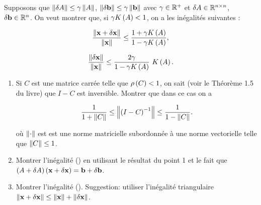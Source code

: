 Supposons que $\left\lVert\delta A\right\rVert \leq \gamma \left\lVert A\right\rVert$, $\left\lVert\delta \mathbf{b}\right\rVert \leq \gamma \left\lVert\mathbf{b}\right\rVert$ avec $\gamma \in \mathbb{R}^{+}$ et $\delta A \in \mathbb{R}^{n \times n}$, $\delta \mathbf{b} \in \mathbb{R}^{n}$.
On veut montrer que, si $\gamma K \left(A\right) < 1$, on a les inégalités suivantes :

\begin{equation}
\label{eq:xPlusDelta}
  \dfrac{\left\lVert\mathbf{x} + \delta \mathbf{x}\right\rVert}{\left\lVert\mathbf{x}\right\rVert}
  \leq \dfrac{1 + \gamma K \left(A\right)}{1 - \gamma K \left(A\right)},
\end{equation}

\begin{equation}
\label{eq:xDelta}
  \dfrac{\left\lVert\delta \mathbf{x}\right\rVert}{\left\lVert\mathbf{x}\right\rVert}
  \leq \dfrac{2 \gamma}{1 - \gamma K \left(A\right)} \ K \left(A\right).
\end{equation}

\begin{enumerate}
  \item Si $C$ est une matrice carrée telle que $\rho \left(C\right) < 1$, on sait (voir le Théorème 1.5 du livre) que $I - C$ est inversible.
        Montrer que dans ce cas on a
        
        \begin{equation}
        \label{eq:normC}
          \dfrac{1}{1 + \left\lVert C\right\rVert}
          \leq \left\lVert\left(I - C\right)^{-1}\right\rVert
          \leq \dfrac{1}{1 - \left\lVert C\right\rVert}.
        \end{equation}
        
        où $\left\lVert\cdot\right\rVert$ est est une norme matricielle subordonnée à une norme vectorielle telle que $\left\lVert C\right\rVert \leq 1$. 
        
        \item Montrer l'inégalité () en utilisant le résultat du point 1 et le fait que $\left(A + \delta A\right) \left(\mathbf{x} + \delta \mathbf{x}\right) = \mathbf{b} + \delta \mathbf{b}$.
        
        \item Montrer l'inégalité (). Suggestion: utiliser l'inégalité triangulaire $\left\lVert\mathbf{x} + \delta \mathbf{x}\right\rVert \leq \left\lVert\mathbf{x}\right\rVert + \left\lVert\delta \mathbf{x}\right\rVert$.

\end{enumerate}


